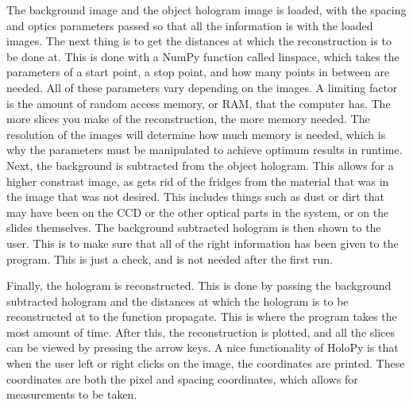The background image and the object hologram image is
loaded, with the spacing and optics parameters passed so that all the
information is with the loaded images. The next thing is to get the distances
at which the reconstruction is to be done at. This is done with a NumPy
function called linspace, which takes the parameters of a start point, a stop
point, and how many points in between are needed. All of these parameters vary
depending on the images. A limiting factor is the amount of random access
memory, or RAM, that the computer has. The more slices you make of the
reconstruction, the more memory needed. The resolution of the images will
determine how much memory is needed, which is why the parameters must be
manipulated to achieve optimum results in runtime. Next, the background is
subtracted from the object hologram. This allows for a higher constrast image,
as gets rid of the fridges from the material that was in the image that was not
desired. This includes things such as dust or dirt that may have been on the
CCD or the other optical parts in the system, or on the slides themselves.
The background subtracted hologram is then shown to the user. This is to make
sure that all of the right information has been given to the program. This is
just a check, and is not needed after the first run.

Finally, the hologram is
reconstructed. This is done by passing the background subtracted hologram and
the distances at which the hologram is to be reconstructed at to the function
propagate. This is where the program takes the most amount of time. After this,
the reconstruction is plotted, and all the slices can be viewed by pressing the
arrow keys. A nice functionality of HoloPy is that when the user left or right
clicks on the image, the coordinates are printed. These coordinates are both
the pixel and spacing coordinates, which allows for measurements to be taken.

















%
%


 
